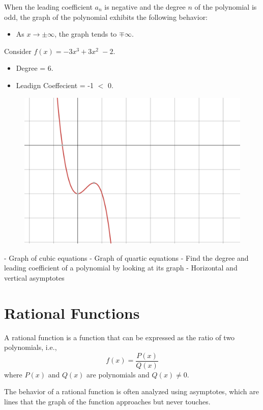 When the leading coefficient \( a_n \) is negative and the degree \( n \) of the polynomial is odd, the graph of the polynomial exhibits the following behavior:

\begin{itemize}
    \item As \( x \to \pm \infty \), the graph tends to \( \mp \infty \).
\end{itemize}


\begin{example}
  Consider   \( f(x) =-3x^{3}+3x^{2\ \ }-2
 \).
  \begin{itemize}
  \item Degree = 6.
  \item Leadign Coeffecient = -1 $<$ 0.
  \end{itemize}

\begin{figure}[H]
  \centering
  \includegraphics[scale=0.2]{"./fig/case_4.png"}
\end{figure}
\end{example}




- Graph of cubic equations
- Graph of quartic equations
- Find the degree and leading coefficient of a polynomial by looking at its graph
- Horizontal and vertical asymptotes
\section{Rational Functions}
\begin{definition}
A rational function is a function that can be expressed as the ratio of two polynomials, i.e.,
\[
f(x) = \frac{P(x)}{Q(x)}
\]
where \( P(x) \) and \( Q(x) \) are polynomials and \( Q(x) \neq 0 \). 
\end{definition}
The behavior of a rational function is often analyzed using asymptotes, which are lines that the graph of the function approaches but never touches.

